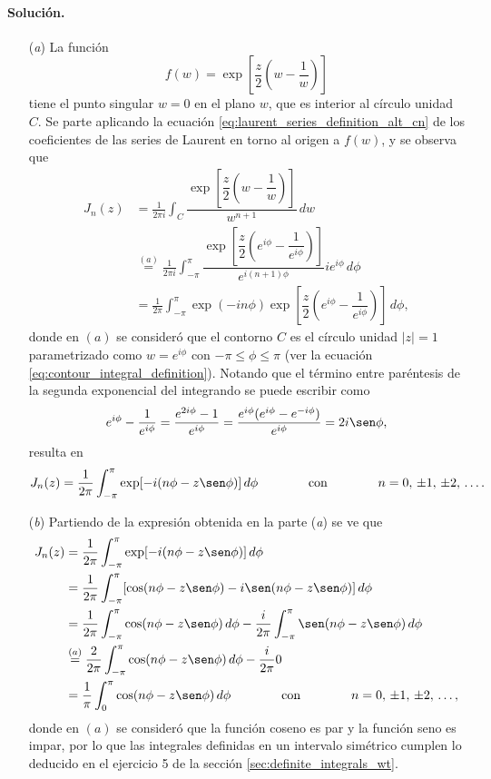 \documentclass[a4paper]{report}
\begin{document}
\paragraph{Solución.}
\begin{enumerate}
 \item[(\textit{a})] La función 
 \[
  f(w)=\exp\left[\frac{z}{2}\left(w-\frac{1}{w}\right)\right]
 \]
 tiene el punto singular \(w=0\) en el plano \(w\), que es interior al círculo unidad \(C\). Se parte aplicando la ecuación \ref{eq:laurent_series_definition_alt_cn} de los coeficientes de las series de Laurent en torno al origen a \(f(w)\), y se observa que 
 \begin{align*}
  J_n(z)&=\frac{1}{2\pi i}\int_C\dfrac{\exp\left[\dfrac{z}{2}\left(w-\dfrac{1}{w}\right)\right]}{w^{n+1}}\,dw\\
   &\overset{(a)}{=}\frac{1}{2\pi i}\int_{-\pi}^\pi\dfrac{\exp\left[\dfrac{z}{2}\left(e^{i\phi}-\dfrac{1}{e^{i\phi}}\right)\right]}{e^{i(n+1)\phi}}ie^{i\phi}\,d\phi\\
   &=\frac{1}{2\pi}\int_{-\pi}^\pi\exp(-in\phi)\exp\left[\dfrac{z}{2}\left(e^{i\phi}-\dfrac{1}{e^{i\phi}}\right)\right]\,d\phi,
 \end{align*}
 donde en \((a)\) se consideró que el contorno \(C\) es el círculo unidad \(|z|=1\) parametrizado como \(w=e^{i\phi}\) con \(-\pi\leq\phi\leq\pi\) (ver la ecuación \ref{eq:contour_integral_definition}). Notando que el término entre paréntesis de la segunda exponencial del integrando se puede escribir como 
 \[
  e^{i\phi}-\frac{1}{e^{i\phi}}=\frac{e^{2i\phi}-1}{e^{i\phi}}=\frac{e^{i\phi}(e^{i\phi}-e^{-i\phi})}{e^{i\phi}}=2i\sen\phi,
 \]
 resulta en
 \[
  J_n(z)=\frac{1}{2\pi}\int_{-\pi}^\pi\exp[-i(n\phi-z\sen\phi)]\,d\phi
  \qquad\qquad\textrm{con}\qquad\qquad
  n=0,\,\pm1,\,\pm2,\,\dots.
 \]
 \item[(\textit{b})] Partiendo de la expresión obtenida en la parte (\textit{a}) se ve que 
 \begin{align*}
  J_n(z)&=\frac{1}{2\pi}\int_{-\pi}^\pi\exp[-i(n\phi-z\sen\phi)]\,d\phi\\
   &=\frac{1}{2\pi}\int_{-\pi}^\pi[\cos(n\phi-z\sen\phi)-i\sen(n\phi-z\sen\phi)]\,d\phi\\
   &=\frac{1}{2\pi}\int_{-\pi}^\pi\cos(n\phi-z\sen\phi)\,d\phi-\frac{i}{2\pi}\int_{-\pi}^\pi\sen(n\phi-z\sen\phi)\,d\phi\\
   &\overset{(a)}{=}\frac{2}{2\pi}\int_{-\pi}^\pi\cos(n\phi-z\sen\phi)\,d\phi-\frac{i}{2\pi}0\\
   &=\frac{1}{\pi}\int_0^\pi\cos(n\phi-z\sen\phi)\,d\phi
  \qquad\qquad\textrm{con}\qquad\qquad
  n=0,\,\pm1,\,\pm2,\,\dots,
 \end{align*}
 donde en \((a)\) se consideró que la función coseno es par y la función seno es impar, por lo que las integrales definidas en un intervalo simétrico cumplen lo deducido en el ejercicio 5 de la sección \ref{sec:definite_integrals_wt}. 
\end{enumerate}
\end{document}
